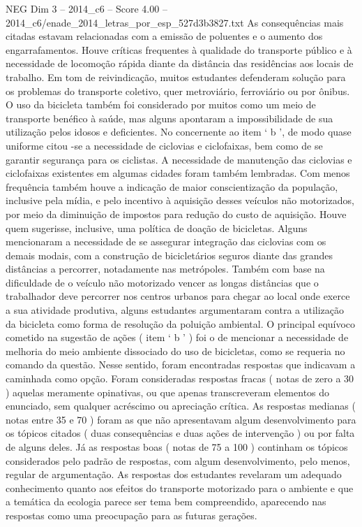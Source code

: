 \begin{textsample}{NEG Dim 3 – 2014\_c6 – Score 4.00 – 2014\_c6/enade\_2014\_letras\_por\_esp\_527d3b3827.txt}
As consequências mais citadas estavam relacionadas com a emissão de poluentes e o aumento dos engarrafamentos.
Houve críticas frequentes à qualidade do transporte público e à necessidade de locomoção rápida diante da distância das residências aos locais de trabalho.
Em tom de reivindicação, muitos estudantes defenderam solução para os problemas do transporte coletivo, quer metroviário, ferroviário ou por ônibus.
O uso da bicicleta também foi considerado por muitos como um meio de transporte benéfico à saúde, mas alguns apontaram a impossibilidade de sua utilização pelos idosos e deficientes.
No concernente ao item ‘ b ’, de modo quase uniforme citou -se a necessidade de ciclovias e ciclofaixas, bem como de se garantir segurança para os ciclistas.
A necessidade de manutenção das ciclovias e ciclofaixas existentes em algumas cidades foram também lembradas.
Com menos frequência também houve a indicação de maior conscientização da população, inclusive pela mídia, e pelo incentivo à aquisição desses veículos não motorizados, por meio da diminuição de impostos para redução do custo de aquisição.
Houve quem sugerisse, inclusive, uma política de doação de bicicletas.
Alguns mencionaram a necessidade de se assegurar integração das ciclovias com os demais modais, com a construção de bicicletários seguros diante das grandes distâncias a percorrer, notadamente nas metrópoles.
Também com base na dificuldade de o veículo não motorizado vencer as longas distâncias que o trabalhador deve percorrer nos centros urbanos para chegar ao local onde exerce a sua atividade produtiva, alguns estudantes argumentaram contra a utilização da bicicleta como forma de resolução da poluição ambiental.
O principal equívoco cometido na sugestão de ações ( item ‘ b ’ ) foi o de mencionar a necessidade de melhoria do meio ambiente dissociado do uso de bicicletas, como se requeria no comando da questão.
Nesse sentido, foram encontradas respostas que indicavam a caminhada como opção.
Foram consideradas respostas fracas ( notas de zero a 30 ) aquelas meramente opinativas, ou que apenas transcreveram elementos do enunciado, sem qualquer acréscimo ou apreciação crítica.
As respostas medianas ( notas entre 35 e 70 ) foram as que não apresentavam algum desenvolvimento para os tópicos citados ( duas consequências e duas ações de intervenção ) ou por falta de alguns deles.
Já as respostas boas ( notas de 75 a 100 ) continham os tópicos considerados pelo padrão de respostas, com algum desenvolvimento, pelo menos, regular de argumentação.
As respostas dos estudantes revelaram um adequado conhecimento quanto aos efeitos do transporte motorizado para o ambiente e que a temática da ecologia parece ser tema bem compreendido, aparecendo nas respostas como uma preocupação para as futuras gerações.

\end{textsample}
